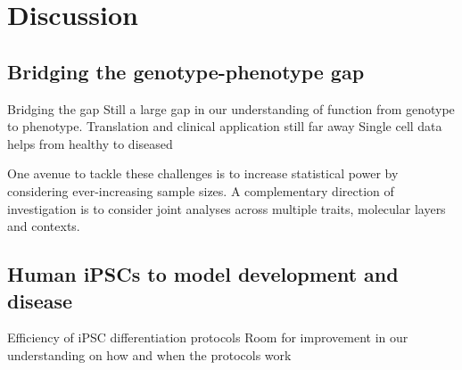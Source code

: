 
\chapter{Discussion}  %

\section{Bridging the genotype-phenotype gap}

Bridging the gap
Still a large gap in our understanding of function from genotype to phenotype.
Translation and clinical application still far away
Single cell data helps
from healthy to diseased

One avenue to tackle these challenges is to increase statistical power by considering
ever-increasing sample sizes. 
A complementary direction of investigation is to consider joint analyses across multiple traits, molecular layers and contexts.

\section{Human iPSCs to model development and disease}

Efficiency of iPSC differentiation protocols
Room for improvement in our understanding on how and when the protocols work




